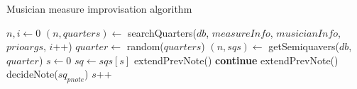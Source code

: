 %   	
%
%
%   	
%

\begin{algorithm}
\caption{Musician measure improvisation algorithm}
\label{algo-musician-measure}
\begin{algorithmic}[1]
 
	\State $n,i\gets0$
		\State $(n,quarters)\gets$ searchQuarters($db$, $measureInfo$,
$musicianInfo$, $prioargs$, $i$++)
	\EndWhile
	\State $quarter\gets$ random($quarters$)
	\State $(n,sqs)\gets$ getSemiquavers($db$, $quarter$)
	\State $s\gets0$
	 
		\State $sq\gets sqs[s]$
			\State extendPrevNote()
			\State \textbf{continue}
		\EndIf
			\State extendPrevNote()
		\Else
			\State decideNote($sq_{pnote}$)
		\EndIf
		\State $s$++
		
	\EndFor
\EndFor
\EndFunction
\end{algorithmic}
\end{algorithm}


